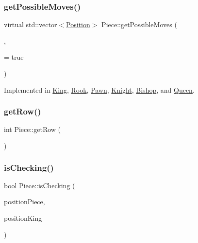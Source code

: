 \mbox{\label{class_piece_a8891924c280568529878549f59541925}} 
\subsubsection{\texorpdfstring{get\+Possible\+Moves()}{getPossibleMoves()}}
{\footnotesize\ttfamily virtual std\+::vector$<$\hyperlink{struct_position}{Position}$>$ Piece\+::get\+Possible\+Moves (\begin{DoxyParamCaption}\item[{std\+::shared\+\_\+ptr$<$ \hyperlink{class_base_board}{Base\+Board} $>$}]{,  }\item[{bool}]{ = {\ttfamily true} }\end{DoxyParamCaption})\hspace{0.3cm}{\ttfamily [pure virtual]}}



Implemented in \hyperlink{class_king_aa8adeaff952af3bf16ebc1c1c0699d43}{King}, \hyperlink{class_rook_a631fce9b569ccf40b5b27cc6cc13cd93}{Rook}, \hyperlink{class_pawn_af83688d6061d4dc14274af99bcbd2614}{Pawn}, \hyperlink{class_knight_a1b8ea442283ed12951dfb67d7382221d}{Knight}, \hyperlink{class_bishop_ab2f9cc1a56bc42fc019ba6edcb4b8426}{Bishop}, and \hyperlink{class_queen_a54461f7bace6797676679ad1da5901d3}{Queen}.

\mbox{\label{class_piece_a070f593242fb8417429ac989184e682b}} 
\subsubsection{\texorpdfstring{get\+Row()}{getRow()}}
{\footnotesize\ttfamily int Piece\+::get\+Row (\begin{DoxyParamCaption}{ }\end{DoxyParamCaption})}

\mbox{\label{class_piece_aa45b0c7c5552437dfd9d4567d2c7e7dd}} 
\subsubsection{\texorpdfstring{is\+Checking()}{isChecking()}}
{\footnotesize\ttfamily bool Piece\+::is\+Checking (\begin{DoxyParamCaption}\item[{\hyperlink{struct_position}{Position}}]{position\+Piece,  }\item[{\hyperlink{struct_position}{Position}}]{position\+King }\end{DoxyParamCaption})}

